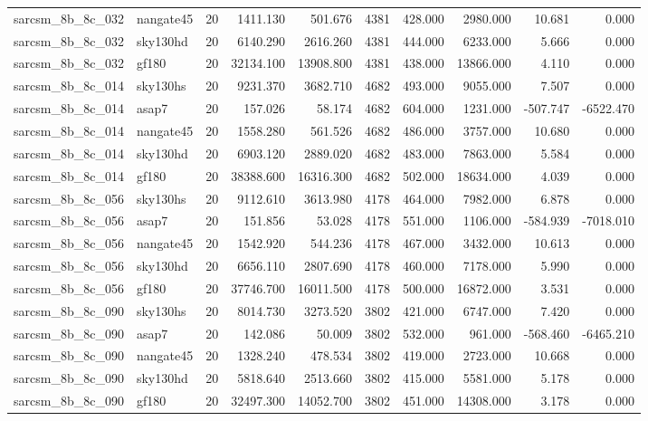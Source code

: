 \begin{longtable}{llrrrrrrrr}
sarcsm\_8b\_8c\_032 & nangate45 & 20 & 1411.130 & 501.676 & 4381 & 428.000 & 2980.000 & 10.681 & 0.000 \\
sarcsm\_8b\_8c\_032 & sky130hd & 20 & 6140.290 & 2616.260 & 4381 & 444.000 & 6233.000 & 5.666 & 0.000 \\
sarcsm\_8b\_8c\_032 & gf180 & 20 & 32134.100 & 13908.800 & 4381 & 438.000 & 13866.000 & 4.110 & 0.000 \\
sarcsm\_8b\_8c\_014 & sky130hs & 20 & 9231.370 & 3682.710 & 4682 & 493.000 & 9055.000 & 7.507 & 0.000 \\
sarcsm\_8b\_8c\_014 & asap7 & 20 & 157.026 & 58.174 & 4682 & 604.000 & 1231.000 & -507.747 & -6522.470 \\
sarcsm\_8b\_8c\_014 & nangate45 & 20 & 1558.280 & 561.526 & 4682 & 486.000 & 3757.000 & 10.680 & 0.000 \\
sarcsm\_8b\_8c\_014 & sky130hd & 20 & 6903.120 & 2889.020 & 4682 & 483.000 & 7863.000 & 5.584 & 0.000 \\
sarcsm\_8b\_8c\_014 & gf180 & 20 & 38388.600 & 16316.300 & 4682 & 502.000 & 18634.000 & 4.039 & 0.000 \\
sarcsm\_8b\_8c\_056 & sky130hs & 20 & 9112.610 & 3613.980 & 4178 & 464.000 & 7982.000 & 6.878 & 0.000 \\
sarcsm\_8b\_8c\_056 & asap7 & 20 & 151.856 & 53.028 & 4178 & 551.000 & 1106.000 & -584.939 & -7018.010 \\
sarcsm\_8b\_8c\_056 & nangate45 & 20 & 1542.920 & 544.236 & 4178 & 467.000 & 3432.000 & 10.613 & 0.000 \\
sarcsm\_8b\_8c\_056 & sky130hd & 20 & 6656.110 & 2807.690 & 4178 & 460.000 & 7178.000 & 5.990 & 0.000 \\
sarcsm\_8b\_8c\_056 & gf180 & 20 & 37746.700 & 16011.500 & 4178 & 500.000 & 16872.000 & 3.531 & 0.000 \\
sarcsm\_8b\_8c\_090 & sky130hs & 20 & 8014.730 & 3273.520 & 3802 & 421.000 & 6747.000 & 7.420 & 0.000 \\
sarcsm\_8b\_8c\_090 & asap7 & 20 & 142.086 & 50.009 & 3802 & 532.000 & 961.000 & -568.460 & -6465.210 \\
sarcsm\_8b\_8c\_090 & nangate45 & 20 & 1328.240 & 478.534 & 3802 & 419.000 & 2723.000 & 10.668 & 0.000 \\
sarcsm\_8b\_8c\_090 & sky130hd & 20 & 5818.640 & 2513.660 & 3802 & 415.000 & 5581.000 & 5.178 & 0.000 \\
sarcsm\_8b\_8c\_090 & gf180 & 20 & 32497.300 & 14052.700 & 3802 & 451.000 & 14308.000 & 3.178 & 0.000 \\

\end{longtable}
